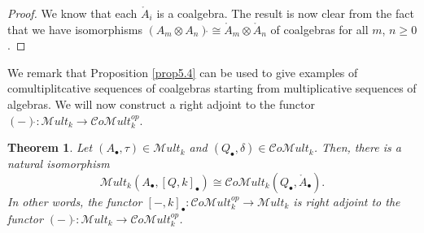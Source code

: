 \documentclass[10pt, colorlinks]{article}
\numberwithin{equation}{section} \DeclareMathSizes{2}{10}{12}{13}
\newtheorem{Thm}[thm]{Theorem}
\begin{document}
    
    \begin{proof} We know that each $\mathring{A}_i$ is a coalgebra. The result is now clear from the fact that we have isomorphisms $({A}_m\otimes A_n)\mathring{}\cong \mathring{A}_m\otimes  \mathring{A}_n $ of coalgebras for all $m$, $n\geq 0$.
       
    \end{proof}


    
We remark that Proposition \ref{prop5.4} can be used to give examples of comultiplitcative sequences of coalgebras starting from multiplicative sequences of algebras. We will now construct a right adjoint to the functor  $(-)\mathring{}:\mathscr Mult_k\longrightarrow \mathcal Co\mathscr Mult_k^{op}.$  


    
    \begin{Thm}
    Let $(A_\bullet,\tau)\in \mathscr Mult_k$ and $(Q_\bullet,\delta)\in\mathcal Co\mathscr Mult_k$. Then, there is a natural isomorphism 
        \begin{equation*}
            \mathscr Mult_k(A_\bullet, [Q,k]_\bullet)\cong\mathcal Co\mathscr Mult_k(Q_\bullet,\mathring{A}_\bullet).
        \end{equation*}
     In other words, the functor $[-,k]_\bullet:\mathcal Co\mathscr Mult_k^{op}\longrightarrow \mathscr Mult_k$ is right adjoint to the functor $(-)\mathring{}:\mathscr Mult_k\longrightarrow \mathcal Co\mathscr Mult_k^{op}$.
    \end{Thm}
\end{document}
